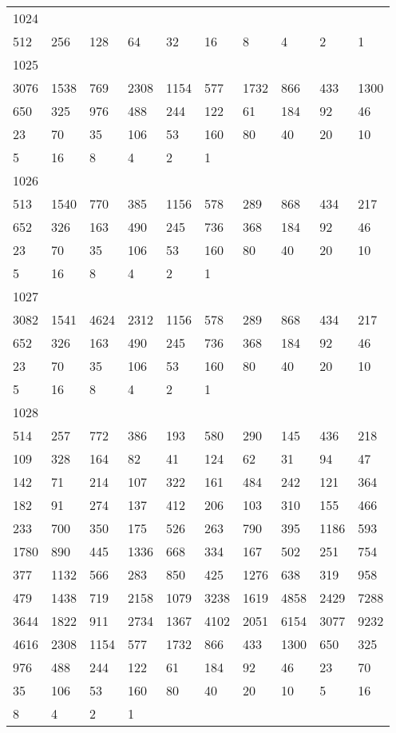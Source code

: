 \begin{longtable}{*{10}{l}}
1024&&&&&&&&&\\
512& 256& 128& 64& 32& 16& 8& 4& 2& 1\\

1025&&&&&&&&&\\
3076& 1538& 769& 2308& 1154& 577& 1732& 866& 433& 1300\\
650& 325& 976& 488& 244& 122& 61& 184& 92& 46\\
23& 70& 35& 106& 53& 160& 80& 40& 20& 10\\
5& 16& 8& 4& 2& 1& \\

1026&&&&&&&&&\\
513& 1540& 770& 385& 1156& 578& 289& 868& 434& 217\\
652& 326& 163& 490& 245& 736& 368& 184& 92& 46\\
23& 70& 35& 106& 53& 160& 80& 40& 20& 10\\
5& 16& 8& 4& 2& 1& \\

1027&&&&&&&&&\\
3082& 1541& 4624& 2312& 1156& 578& 289& 868& 434& 217\\
652& 326& 163& 490& 245& 736& 368& 184& 92& 46\\
23& 70& 35& 106& 53& 160& 80& 40& 20& 10\\
5& 16& 8& 4& 2& 1& \\

1028&&&&&&&&&\\
514& 257& 772& 386& 193& 580& 290& 145& 436& 218\\
109& 328& 164& 82& 41& 124& 62& 31& 94& 47\\
142& 71& 214& 107& 322& 161& 484& 242& 121& 364\\
182& 91& 274& 137& 412& 206& 103& 310& 155& 466\\
233& 700& 350& 175& 526& 263& 790& 395& 1186& 593\\
1780& 890& 445& 1336& 668& 334& 167& 502& 251& 754\\
377& 1132& 566& 283& 850& 425& 1276& 638& 319& 958\\
479& 1438& 719& 2158& 1079& 3238& 1619& 4858& 2429& 7288\\
3644& 1822& 911& 2734& 1367& 4102& 2051& 6154& 3077& 9232\\
4616& 2308& 1154& 577& 1732& 866& 433& 1300& 650& 325\\
976& 488& 244& 122& 61& 184& 92& 46& 23& 70\\
35& 106& 53& 160& 80& 40& 20& 10& 5& 16\\
8& 4& 2& 1& \\


\end{longtable}
